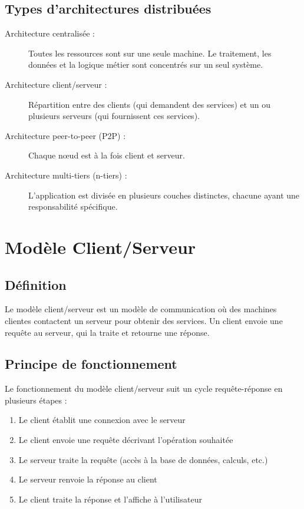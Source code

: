 \documentclass[12pt,a4paper,twoside]{report}
\begin{document}
\subsection{Types d'architectures distribuées}

\begin{description}
    \item[Architecture centralisée :] Toutes les ressources sont sur une seule machine. Le traitement, les données et la logique métier sont concentrés sur un seul système.
    \item[Architecture client/serveur :] Répartition entre des clients (qui demandent des services) et un ou plusieurs serveurs (qui fournissent ces services).
    \item[Architecture peer-to-peer (P2P) :] Chaque nœud est à la fois client et serveur.
    \item[Architecture multi-tiers (n-tiers) :] L'application est divisée en plusieurs couches distinctes, chacune ayant une responsabilité spécifique.
\end{description}

\section{Modèle Client/Serveur}

\subsection{Définition}

Le modèle client/serveur est un modèle de communication où des machines clientes contactent un serveur pour obtenir des services. Un client envoie une requête au serveur, qui la traite et retourne une réponse.

\subsection{Principe de fonctionnement}

Le fonctionnement du modèle client/serveur suit un cycle requête-réponse en plusieurs étapes :
\begin{enumerate}
    \item Le client établit une connexion avec le serveur
    \item Le client envoie une requête décrivant l'opération souhaitée
    \item Le serveur traite la requête (accès à la base de données, calculs, etc.)
    \item Le serveur renvoie la réponse au client
    \item Le client traite la réponse et l'affiche à l'utilisateur
\end{enumerate}
\end{document}
